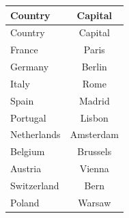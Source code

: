 \begin{longtable}{lc}
\toprule
Country & Capital \\
\midrule
\endfirsthead
\toprule
Country & Capital \\
\midrule
\endhead
France & Paris \\
Germany & Berlin \\
Italy & Rome \\
Spain & Madrid \\
Portugal & Lisbon \\
Netherlands & Amsterdam \\
Belgium & Brussels \\
Austria & Vienna \\
Switzerland & Bern \\
Poland & Warsaw \\
\bottomrule
\end{longtable}
